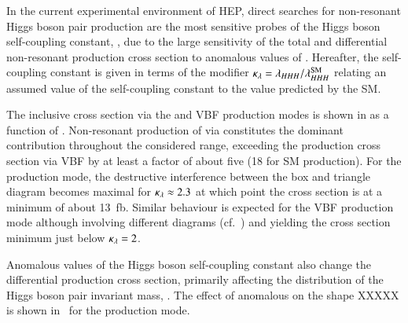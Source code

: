 
In the current experimental environment of HEP, direct searches for
non-resonant Higgs boson pair production are the most sensitive probes
of the Higgs boson self-coupling constant, \lambdahhh, due to the
large sensitivity of the total and differential non-resonant \HH
production cross section to anomalous values of \lambdahhh. Hereafter,
the self-coupling constant is given in terms of the modifier
$\kappa_{\lambda} = \lambda_{HHH} / \lambda_{HHH}^{\text{SM}}$ relating an assumed
value of the self-coupling constant to the value predicted by the SM.

The inclusive \HH cross section via the \ggF and VBF production modes
is shown in  as a function of
\klambda. Non-resonant production of \HH via \ggF constitutes the
dominant contribution throughout the considered \klambda range,
exceeding the production cross section via VBF by at least a factor of
about five (18 for SM \HH production). For the \ggF production mode,
the destructive interference between the box and triangle diagram
becomes maximal for $\kappa_{\lambda} \approx 2.3$ at which point the cross
section is at a minimum of about \SI{13}{\femto\barn}. Similar
behaviour is expected for the VBF production mode although involving
different diagrams (cf.\ ) and yielding the
cross section minimum just below $\kappa_{\lambda} = 2$.

Anomalous values of the Higgs boson self-coupling constant also change
the differential \HH production cross section, primarily affecting the
distribution of the Higgs boson pair invariant mass, \mHH. The effect
of anomalous \klambda on the shape XXXXX is shown
in~ for the \ggF production mode.

